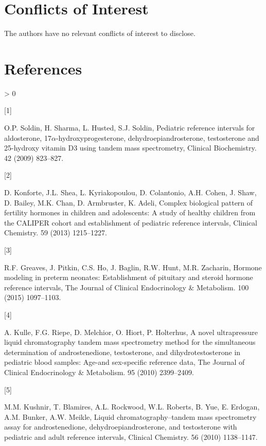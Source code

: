 \documentclass[]{elsarticle} %
\newlength{\csllabelwidth}
\newlength{\cslhangindent}
\newenvironment{CSLReferences}[3] %
 {%
  \setlength{\parindent}{0pt}
  \ifodd #1 \everypar{\setlength{\hangindent}{\cslhangindent}}\ignorespaces\fi
  \ifnum #2 > 0
  \setlength{\parskip}{#2\baselineskip}
  \fi
 }%
 {}
\newcommand{\CSLLeftMargin}[1]{\parbox[t]{\csllabelwidth}{#1}}
\newcommand{\CSLRightInline}[1]{\parbox[t]{\linewidth - \csllabelwidth}{#1}}
\begin{document}
\hypertarget{conflicts-of-interest}{%
\section{Conflicts of Interest}\label{conflicts-of-interest}}

The authors have no relevant conflicts of interest to disclose.

\hypertarget{references}{%
\section*{References}\label{references}}

\hypertarget{refs}{}
\begin{CSLReferences}{0}{0}
\leavevmode\hypertarget{ref-soldin2009pediatric}{}%
\CSLLeftMargin{{[}1{]} }
\CSLRightInline{O.P. Soldin, H. Sharma, L. Husted, S.J. Soldin,
Pediatric reference intervals for aldosterone,
17\(\alpha\)-hydroxyprogesterone, dehydroepiandrosterone, testosterone
and 25-hydroxy vitamin D3 using tandem mass spectrometry, Clinical
Biochemistry. 42 (2009) 823--827.}

\leavevmode\hypertarget{ref-konforte2013complex}{}%
\CSLLeftMargin{{[}2{]} }
\CSLRightInline{D. Konforte, J.L. Shea, L. Kyriakopoulou, D. Colantonio,
A.H. Cohen, J. Shaw, D. Bailey, M.K. Chan, D. Armbruster, K. Adeli,
Complex biological pattern of fertility hormones in children and
adolescents: A study of healthy children from the CALIPER cohort and
establishment of pediatric reference intervals, Clinical Chemistry. 59
(2013) 1215--1227.}

\leavevmode\hypertarget{ref-greaves2015hormone}{}%
\CSLLeftMargin{{[}3{]} }
\CSLRightInline{R.F. Greaves, J. Pitkin, C.S. Ho, J. Baglin, R.W. Hunt,
M.R. Zacharin, Hormone modeling in preterm neonates: Establishment of
pituitary and steroid hormone reference intervals, The Journal of
Clinical Endocrinology \& Metabolism. 100 (2015) 1097--1103.}

\leavevmode\hypertarget{ref-kulle2010novel}{}%
\CSLLeftMargin{{[}4{]} }
\CSLRightInline{A. Kulle, F.G. Riepe, D. Melchior, O. Hiort, P.
Holterhus, A novel ultrapressure liquid chromatography tandem mass
spectrometry method for the simultaneous determination of
androstenedione, testosterone, and dihydrotestosterone in pediatric
blood samples: Age-and sex-specific reference data, The Journal of
Clinical Endocrinology \& Metabolism. 95 (2010) 2399--2409.}

\leavevmode\hypertarget{ref-kushnir2010liquid}{}%
\CSLLeftMargin{{[}5{]} }
\CSLRightInline{M.M. Kushnir, T. Blamires, A.L. Rockwood, W.L. Roberts,
B. Yue, E. Erdogan, A.M. Bunker, A.W. Meikle, Liquid
chromatography--tandem mass spectrometry assay for androstenedione,
dehydroepiandrosterone, and testosterone with pediatric and adult
reference intervals, Clinical Chemistry. 56 (2010) 1138--1147.}


\end{CSLReferences}
\end{document}
